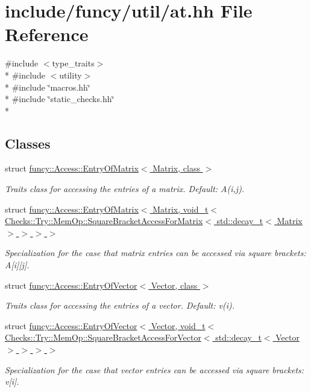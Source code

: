 \hypertarget{at_8hh}{\section{include/funcy/util/at.hh File Reference}
\label{at_8hh}
}
{\ttfamily \#include $<$type\-\_\-traits$>$}\\*
{\ttfamily \#include $<$utility$>$}\\*
{\ttfamily \#include \char`\"{}macros.\-hh\char`\"{}}\\*
{\ttfamily \#include \char`\"{}static\-\_\-checks.\-hh\char`\"{}}\\*
\subsection*{Classes}
\begin{DoxyCompactItemize}
\item 
struct \hyperlink{structfuncy_1_1Access_1_1EntryOfMatrix}{funcy\-::\-Access\-::\-Entry\-Of\-Matrix$<$ Matrix, class $>$}
\begin{DoxyCompactList}\small\item\em Traits class for accessing the entries of a matrix. Default\-: A(i,j). \end{DoxyCompactList}\item 
struct \hyperlink{structfuncy_1_1Access_1_1EntryOfMatrix_3_01Matrix_00_01void__t_3_01Checks_1_1Try_1_1MemOp_1_1Squ7a075b4fa54d007e4cf9d29dbba38820}{funcy\-::\-Access\-::\-Entry\-Of\-Matrix$<$ Matrix, void\-\_\-t$<$ Checks\-::\-Try\-::\-Mem\-Op\-::\-Square\-Bracket\-Access\-For\-Matrix$<$ std\-::decay\-\_\-t$<$ Matrix $>$ $>$ $>$ $>$}
\begin{DoxyCompactList}\small\item\em Specialization for the case that matrix entries can be accessed via square brackets\-: A\mbox{[}i\mbox{]}\mbox{[}j\mbox{]}. \end{DoxyCompactList}\item 
struct \hyperlink{structfuncy_1_1Access_1_1EntryOfVector}{funcy\-::\-Access\-::\-Entry\-Of\-Vector$<$ Vector, class $>$}
\begin{DoxyCompactList}\small\item\em Traits class for accessing the entries of a vector. Default\-: v(i). \end{DoxyCompactList}\item 
struct \hyperlink{structfuncy_1_1Access_1_1EntryOfVector_3_01Vector_00_01void__t_3_01Checks_1_1Try_1_1MemOp_1_1Squ5cd836559cca83db378509772a83f5e4}{funcy\-::\-Access\-::\-Entry\-Of\-Vector$<$ Vector, void\-\_\-t$<$ Checks\-::\-Try\-::\-Mem\-Op\-::\-Square\-Bracket\-Access\-For\-Vector$<$ std\-::decay\-\_\-t$<$ Vector $>$ $>$ $>$ $>$}
\begin{DoxyCompactList}\small\item\em Specialization for the case that vector entries can be accessed via square brackets\-: v\mbox{[}i\mbox{]}. \end{DoxyCompactList}\end{DoxyCompactItemize}
